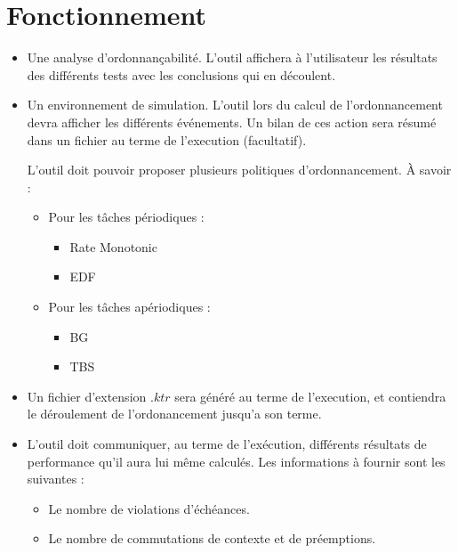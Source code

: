 \section{Fonctionnement}
\begin{itemize}
\item
Une analyse d'ordonnançabilité. L'outil affichera à l'utilisateur les résultats des différents tests avec les conclusions qui en découlent.
\item
Un environnement de simulation. L'outil lors du calcul de l'ordonnancement devra afficher les différents événements. Un bilan de ces action sera résumé dans un fichier au terme de l'execution (facultatif).

L'outil doit pouvoir proposer plusieurs politiques d'ordonnancement. \`A savoir : 
\begin{itemize}
\item
Pour les tâches périodiques :

\begin{itemize}
\item
Rate Monotonic
\item
EDF
\end{itemize}

\item
Pour les tâches apériodiques : 
\begin{itemize}
\item
BG
\item
TBS
\end{itemize}

\end{itemize} 
\item
Un fichier d'extension $.ktr$ sera généré au terme de l'execution, et contiendra le déroulement de l'ordonancement jusqu'a son terme.
\item
L'outil doit communiquer, au terme de l'exécution, différents résultats de performance qu'il aura lui même calculés. Les informations à fournir sont les suivantes : 
\begin{itemize}
\item
Le nombre de violations d'échéances.
\item
Le nombre de commutations de contexte et de préemptions.


\end{itemize}
\end{itemize}

